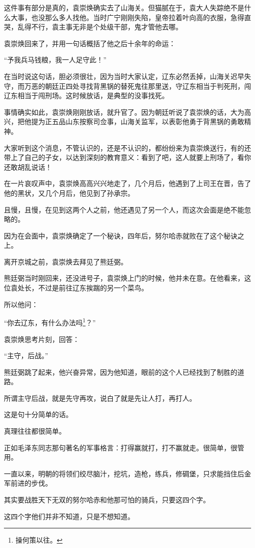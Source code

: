 \begin{multicols}{\theparacolNo}
这件事有部分是真的，袁崇焕确实去了山海关。但猫腻在于，袁大人失踪绝不是什么大事，也没那么多人找他。当时广宁刚刚失陷，皇帝拉着叶向高的衣服，急得直哭，乱得不行，袁主事无非是个处级干部，鬼才管他去哪。

袁崇焕回来了，并用一句话概括了他之后十余年的命运：

“予我兵马钱粮，我一人足守此！”

在当时说这句话，胆必须很壮，因为当时大家认定，辽东必然丢掉，山海关迟早失守，而万恶的朝廷正四处寻找背黑锅的替死鬼往那里送，守辽东相当于判死刑，闯辽东相当于闯刑场。这时候放话，是典型的没事找死。

事情确实如此，袁崇焕刚刚放话，就升官了。因为朝廷听说了袁崇焕的话，大为高兴，把他提为正五品山东按察司佥事，山海关监军，以表彰他勇于背黑锅的勇敢精神。

大家听到这个消息，不管认识的，还是不认识的，都纷纷来为袁崇焕送行，有的还带上了自己的子女，以达到深刻的教育意义：看到了吧，这人就要上刑场了，看你还敢胡乱说话！

在一片哀叹声中，袁崇焕高高兴兴地走了，几个月后，他遇到了上司王在晋，告了他的黑状，又几个月后，他见到了孙承宗。

且慢，且慢，在见到这两个人之前，他还遇见了另一个人，而这次会面是绝不能忽略的。

因为在会面中，袁崇焕确定了一个秘诀，四年后，努尔哈赤就败在了这个秘诀之上。

离开京城之前，袁崇焕去拜见了熊廷弼。

熊廷弼当时刚回来，还没进号子，袁崇焕上门的时候，他并未在意。在他看来，这位袁处长，不过是前往辽东挨踹的另一个菜鸟。

所以他问：

“你去辽东，有什么办法吗\footnote{操何策以往。}？”

袁崇焕思考片刻，回答：

“主守，后战。”

熊廷弼跳了起来，他兴奋异常，因为他知道，眼前的这个人已经找到了制胜的道路。

所谓主守后战，就是先守再攻，说白了就是先让人打，再打人。

这是句十分简单的话。

真理往往都很简单。

正如毛泽东同志那句著名的军事格言：打得赢就打，打不赢就走。很简单，很管用。

一直以来，明朝的将领们绞尽脑汁，挖坑，造枪，练兵，修碉堡，只求能挡住后金军前进的步伐。

其实要战胜天下无双的努尔哈赤和他那可怕的骑兵，只要这四个字。

这四个字他们并非不知道，只是不想知道。


\end{multicols}
